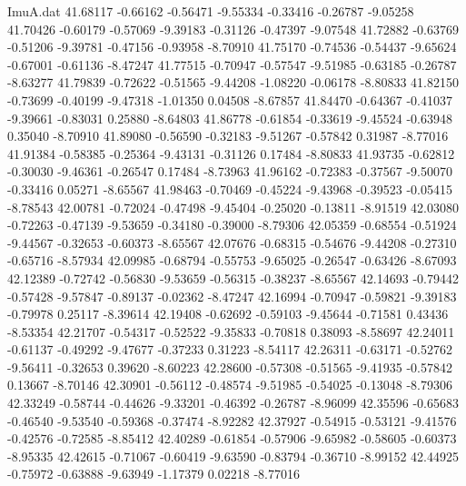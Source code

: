 \begin{filecontents}{ImuA.dat}
  41.68117   -0.66162   -0.56471   -9.55334   -0.33416   -0.26787   -9.05258
  41.70426   -0.60179   -0.57069   -9.39183   -0.31126   -0.47397   -9.07548
  41.72882   -0.63769   -0.51206   -9.39781   -0.47156   -0.93958   -8.70910
  41.75170   -0.74536   -0.54437   -9.65624   -0.67001   -0.61136   -8.47247
  41.77515   -0.70947   -0.57547   -9.51985   -0.63185   -0.26787   -8.63277
  41.79839   -0.72622   -0.51565   -9.44208   -1.08220   -0.06178   -8.80833
  41.82150   -0.73699   -0.40199   -9.47318   -1.01350    0.04508   -8.67857
  41.84470   -0.64367   -0.41037   -9.39661   -0.83031    0.25880   -8.64803
  41.86778   -0.61854   -0.33619   -9.45524   -0.63948    0.35040   -8.70910
  41.89080   -0.56590   -0.32183   -9.51267   -0.57842    0.31987   -8.77016
  41.91384   -0.58385   -0.25364   -9.43131   -0.31126    0.17484   -8.80833
  41.93735   -0.62812   -0.30030   -9.46361   -0.26547    0.17484   -8.73963
  41.96162   -0.72383   -0.37567   -9.50070   -0.33416    0.05271   -8.65567
  41.98463   -0.70469   -0.45224   -9.43968   -0.39523   -0.05415   -8.78543
  42.00781   -0.72024   -0.47498   -9.45404   -0.25020   -0.13811   -8.91519
  42.03080   -0.72263   -0.47139   -9.53659   -0.34180   -0.39000   -8.79306
  42.05359   -0.68554   -0.51924   -9.44567   -0.32653   -0.60373   -8.65567
  42.07676   -0.68315   -0.54676   -9.44208   -0.27310   -0.65716   -8.57934
  42.09985   -0.68794   -0.55753   -9.65025   -0.26547   -0.63426   -8.67093
  42.12389   -0.72742   -0.56830   -9.53659   -0.56315   -0.38237   -8.65567
  42.14693   -0.79442   -0.57428   -9.57847   -0.89137   -0.02362   -8.47247
  42.16994   -0.70947   -0.59821   -9.39183   -0.79978    0.25117   -8.39614
  42.19408   -0.62692   -0.59103   -9.45644   -0.71581    0.43436   -8.53354
  42.21707   -0.54317   -0.52522   -9.35833   -0.70818    0.38093   -8.58697
  42.24011   -0.61137   -0.49292   -9.47677   -0.37233    0.31223   -8.54117
  42.26311   -0.63171   -0.52762   -9.56411   -0.32653    0.39620   -8.60223
  42.28600   -0.57308   -0.51565   -9.41935   -0.57842    0.13667   -8.70146
  42.30901   -0.56112   -0.48574   -9.51985   -0.54025   -0.13048   -8.79306
  42.33249   -0.58744   -0.44626   -9.33201   -0.46392   -0.26787   -8.96099
  42.35596   -0.65683   -0.46540   -9.53540   -0.59368   -0.37474   -8.92282
  42.37927   -0.54915   -0.53121   -9.41576   -0.42576   -0.72585   -8.85412
  42.40289   -0.61854   -0.57906   -9.65982   -0.58605   -0.60373   -8.95335
  42.42615   -0.71067   -0.60419   -9.63590   -0.83794   -0.36710   -8.99152
  42.44925   -0.75972   -0.63888   -9.63949   -1.17379    0.02218   -8.77016

\end{filecontents}
